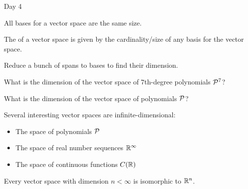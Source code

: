 
\begin{applicationActivities}{Day 4}

\begin{fact}
  All bases for a vector space are the same size.
\end{fact}

\begin{definition}
  The  of a vector space is given by the cardinality/size
  of any basis for the vector space.
\end{definition}

\begin{activity}{15}
  Reduce a bunch of spans to bases to find their dimension.
\end{activity}

\begin{activity}{5}
  What is the dimension of the vector space of \(7\)th-degree polynomials
  \(\P^7\)?
\end{activity}

\begin{activity}{10}
  What is the dimension of the vector space of polynomials
  \(\P\)?
\end{activity}

\begin{observation}
  Several interesting vector spaces are infinite-dimensional:
  \begin{itemize}
    \item The space of polynomials \(\P\)
    \item The space of real number sequences \(\IR^\infty\)
    \item The space of continuous functions \(C(\IR)\)
  \end{itemize}
\end{observation}

\begin{fact}
  Every vector space with dimension \(n<\infty\) is isomorphic to \(\IR^n\).
\end{fact}

\end{applicationActivities}
